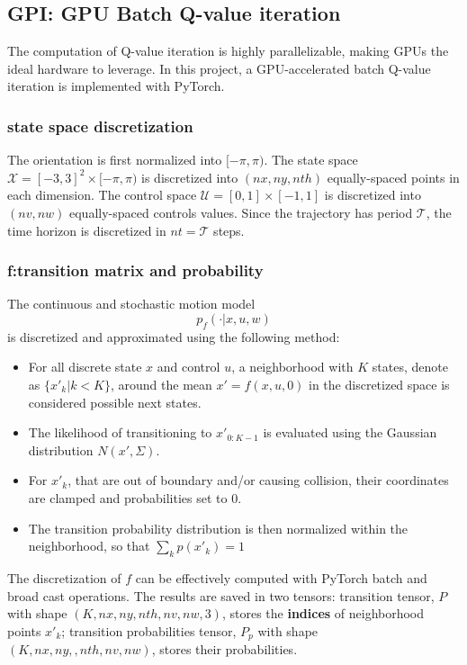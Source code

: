 \documentclass[conference]{IEEEtran}
\begin{document}
\subsection{GPI: GPU Batch Q-value iteration}
The computation of Q-value iteration is highly parallelizable, 
making GPUs the ideal hardware to leverage. 
In this project, 
a GPU-accelerated batch Q-value iteration is implemented with PyTorch.

\subsubsection{state space discretization}
The orientation is first normalized into $[-\pi,\pi)$.
The state space $\mathcal{X} = [-3,3]^2\times[-\pi,\pi)$ is
discretized into $(nx, ny, nth)$ equally-spaced points in each dimension.
The control space $\mathcal{U} = [0,1]\times[-1,1]$ is discretized into $(nv,nw)$
equally-spaced controls values.
Since the trajectory has period $\mathcal{T}$, 
the time horizon is discretized in $nt=\mathcal{T}$ steps.

\subsubsection{f:transition matrix and probability}
The continuous and stochastic motion model
\[p_f(\cdot | x, u, w) \]
is discretized and approximated using the following method:

\begin{itemize}
    \item For all discrete state \( x \) and control \( u \),
    a neighborhood with $K$ states, denote as \( \{x'_{k} |k < K\}\), 
    around the mean \(x' = f(x, u, 0) \) in the discretized space 
    is considered possible next states.
    \item  The likelihood of transitioning to \( x'_{0:K-1} \)
    is evaluated using the Gaussian distribution \( N(x', \Sigma) \).
    \item For $x'_k$, that are out of boundary and/or causing collision, 
    their coordinates are clamped and probabilities set to 0.
    \item The transition probability distribution is then normalized within 
    the neighborhood, so that  \(\sum_k p(x'_{k}) = 1\) 
\end{itemize}

The discretization of $f$ can be effectively computed with PyTorch batch and broad cast operations.
The results are saved in two tensors:
transition tensor, $P$ with shape $(K, nx, ny, nth, nv, nw, 3)$, stores the \textbf{indices} of neighborhood points $x'_k$;
transition probabilities tensor, $P_p$ with shape $(K, nx, ny, ,nth, nv, nw)$, stores their probabilities.
\end{document}
